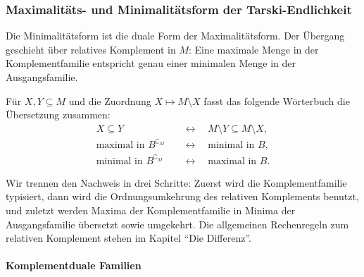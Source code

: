 \documentclass[main.tex]{subfiles}
\begin{document}
\subsubsection[Max.- und Min.-Form der Tarski-Endlichkeit]{Maximalitäts- und Minimalitätsform der Tarski-Endlichkeit}

Die Minimalitätsform ist die duale Form der Maximalitätsform. Der Übergang
geschieht über relatives Komplement in \(M\): Eine maximale Menge in der
Komplementfamilie entspricht genau einer minimalen Menge in der
Ausgangsfamilie.

Für \(X,Y\subseteq M\) und die Zuordnung \(X\mapsto M\setminus X\) fasst das
folgende Wörterbuch die Übersetzung zusammen:
\[
\begin{aligned}
X\subseteq Y
  &\quad\longleftrightarrow\quad
  M\setminus Y\subseteq M\setminus X,\\
\text{maximal in }B^{\complement_M}
  &\quad\longleftrightarrow\quad
  \text{minimal in }B,\\
\text{minimal in }B^{\complement_M}
  &\quad\longleftrightarrow\quad
  \text{maximal in }B.
\end{aligned}
\]

Wir trennen den Nachweis in drei Schritte: Zuerst wird die Komplementfamilie
typisiert, dann wird die Ordnungsumkehrung des relativen Komplements benutzt,
und zuletzt werden Maxima der Komplementfamilie in Minima der Ausgangsfamilie
übersetzt sowie umgekehrt.
Die allgemeinen Rechenregeln zum relativen Komplement stehen im Kapitel
\enquote{Die Differenz}.

\paragraph{Komplementduale Familien}


\begin{tabproofsplit}
  \proofpart{\(\vdash\)}
  \closeproofpart

  \proofpart{\(\dashv\)}
  \closeproofpart
\end{tabproofsplit}
\end{document}
